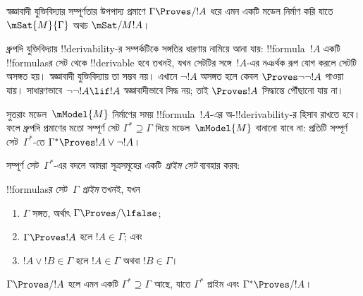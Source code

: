 \documentclass[../../../include/open-logic-section]{subfiles}
\begin{document}


স্বজ্ঞাবাদী যুক্তিবিদ্যার সম্পূর্ণতার উপপাদ্য প্রমাণে $\Gamma \Proves/ !A$
ধরে এমন একটি মডেল নির্মাণ করি যাতে $\mSat{M}{\Gamma}$ অথচ
$\mSat/{M}{!A}$।

ধ্রুপদি যুক্তিবিদ্যায় !!{derivability}-র সম্পর্কটিকে সঙ্গতির ধারণায়
নামিয়ে আনা যায়: !!{formula}~$!A$ একটি !!{formula}sর সেট থেকে
!!{derivable} হবে তখনই, যখন সেটটির সঙ্গে~$!A$-এর নঞর্থক রূপ
যোগ করলে সেটটি অসঙ্গত হয়। স্বজ্ঞাবাদী যুক্তিবিদ্যায় তা সম্ভব নয়।
এখানে $\lnot!A$ অসঙ্গত হলে কেবল $\Proves \lnot\lnot !A$ পাওয়া যায়।
সাধারণভাবে $\lnot\lnot!A \lif !A$ স্বজ্ঞাবাদীভাবে সিদ্ধ নয়; তাই
$\Proves !A$ সিদ্ধান্তে পৌঁছানো যায় না।

সুতরাং মডেল~$\mModel{M}$ নির্মাণের সময় !!{formula}~$!A$-এর
অ-!!{derivability}-র হিসাব রাখতে হবে। ফলে ধ্রুপদি প্রমাণের মতো
সম্পূর্ণ সেট $\Gamma^* \supseteq \Gamma$ দিয়ে মডেল~$\mModel{M}$
বানানো যাবে না: প্রতিটি সম্পূর্ণ সেট~$\Gamma^*$-তে
$\Gamma^* \Proves !A \lor \lnot !A$।

সম্পূর্ণ সেট~$\Gamma^*$-এর বদলে আমরা সূত্রসমূহের একটি
\emph{প্রাইম সেট} ব্যবহার করব:

\begin{defn}
  !!{formula}sর সেট~$\Gamma$ \emph{প্রাইম} তখনই, যখন
  \begin{enumerate}
  \item{} $\Gamma$ সঙ্গত, অর্থাৎ $\Gamma \Proves/ \lfalse$;
  \item{} $\Gamma \Proves !A$ হলে $!A \in \Gamma$; এবং
  \item{} $!A \lor !B \in \Gamma$ হলে $!A \in
    \Gamma$ অথবা $!B \in \Gamma$।
  \end{enumerate}
\end{defn}

\begin{lem}[লিন্ডেনবাউমের সহায়ক উপপাদ্য]
   $\Gamma \Proves/ !A$ হলে এমন একটি
  $\Gamma^* \supseteq \Gamma$ আছে, যাতে $\Gamma^*$ প্রাইম এবং
  $\Gamma^* \Proves/ !A$।
\end{lem}
\end{document}
